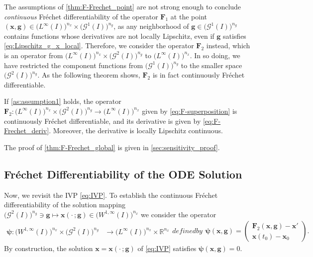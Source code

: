 \documentclass[onefignum,onetabnum]{siamart220329}
\numberwithin{equation}{section}
\newcommand {\real} {\mathbb{R}}
\newcommand{\bg}{\ensuremath{\mathbf{g}}} %
\newcommand{\bx}{\ensuremath{\mathbf{x}}} %
\newcommand {\bpsi} {\boldsymbol{\psi}}
\newcommand{\BF}{\ensuremath{\mathbf{F}} } %
\newcommand {\cG} {\mathcal{G}}
\newcommand{\WW}{\big( W^{1, \infty}(I) \big)^{n_x}}
\newcommand{\LL}{\big(L^\infty(I) \big)^{n_x}}
\begin{document}
The assumptions of \cref{thm:F-Frechet_point} are not strong enough to conclude \emph{continuous} Fr\'echet differentiability of the operator $\BF_1$ 
at the point $(\bx, \bg) \in \LL \times \big(\cG^1(I)\big)^{n_g}$, 
as any neighborhood of $\bg \in \big(\cG^1(I)\big)^{n_g}$ contains functions whose derivatives are not locally Lipschitz, even if $\bg$ satisfies \cref{eq:Lipschitz_g_x_local}. 
Therefore, we consider the operator $\BF_2$ instead, which is an operator from
$ \LL \times \big(\cG^2(I)\big)^{n_g}$ to $ \LL$. In so doing, we have restricted the component functions from $\big(\cG^1(I)\big)^{n_g}$ to the smaller space $\big(\cG^2(I)\big)^{n_g}$. As the following theorem shows, $\BF_2$ is in fact continuously Fr\'echet differentiable.

\begin{theorem} \label{thm:F-Frechet_global}
    If \cref{as:assumption1}  holds, the operator  $\BF_2 :  \LL \times \big(\cG^2(I)\big)^{n_g} \rightarrow  \LL$
    given by \cref{eq:F-superposition} is continuously Fr\'echet differentiable, and its derivative is given by
    \cref{eq:F-Frechet_deriv}. Moreover, the derivative is locally Lipschitz continuous.
\end{theorem}
The proof of \cref{thm:F-Frechet_global} is given in \cref{sec:sensitivity_proof}.




\subsection{Fr\'echet Differentiability of the ODE Solution} \label{sec:frechet-differentiability-solution}
Now, we revisit the IVP \cref{eq:IVP}. To establish the continuous Fr\'echet differentiability of the solution mapping
$\big(\cG^2(I)\big)^{n_g} \ni \bg \mapsto \bx(\cdot \, ; \bg) \in \WW$ we consider 
the operator
\begin{subequations} \label{eq:psi}
\begin{align}
	\bpsi :  \WW\times \big(\cG^2(I)\big)^{n_g}  & \rightarrow  \LL \times \real^{n_x}
\end{align}
defined by
\begin{align}
	\bpsi(\bx, \bg) 
	            = \begin{pmatrix} \BF_2(\bx, \bg )  -  \bx' \\  \bx(t_0) - \bx_0 \end{pmatrix}. 
\end{align}
\end{subequations}
By construction, the solution $\bx =  \bx(\cdot \, ; \bg)$ of \cref{eq:IVP} satisfies $\bpsi(\bx, \bg) = 0$.
\end{document}

